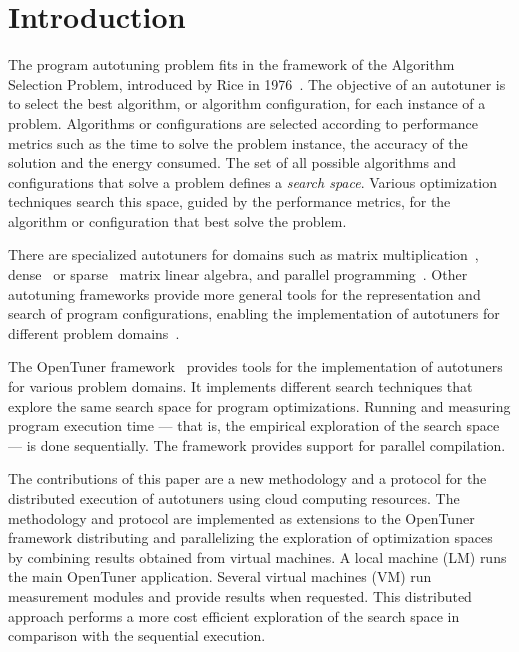 \section{Introduction} \label{sec:intro}

The program autotuning problem fits in the framework of the Algorithm Selection
Problem, introduced by Rice in 1976~\cite{rice1976algorithm}. The objective of
an autotuner is to select the best algorithm, or algorithm configuration, for
each instance of a problem.  Algorithms or configurations are selected
according to performance metrics such as the time to solve the problem
instance, the accuracy of the solution and the energy consumed.  The set of all
possible algorithms and configurations that solve a problem defines a
\emph{search space}. Various optimization techniques search this space, guided
by the performance metrics, for the algorithm or configuration that best solve
the problem.

There are specialized autotuners for domains such as matrix
multiplication~\cite{bilmes1997phipac}, dense~\cite{whaley1998atlas} or
sparse~\cite{vuduc2005oski} matrix linear algebra, and parallel
programming~\cite{jordan2012multi}. Other autotuning frameworks provide more
general tools for the representation and search of program configurations,
enabling the implementation of autotuners for different problem
domains~\cite{ansel2014opentuner,hutter2009paramils}.

The OpenTuner framework~\cite{ansel2014opentuner} provides tools for the
implementation of autotuners for various problem domains. It implements
different search techniques that explore the same search space for program
optimizations.
Running and measuring program execution time --- that is, the empirical
exploration of the search space --- is done sequentially.
The framework provides support for parallel compilation.

The contributions of this paper are a new methodology and a protocol for the
distributed execution of autotuners using cloud computing resources.  The
methodology and protocol are implemented as extensions to the OpenTuner
framework distributing and parallelizing the exploration of optimization spaces
by combining results obtained from virtual machines.  A local machine (LM) runs
the main OpenTuner application. Several virtual machines (VM) run measurement
modules and provide results when requested. This distributed approach performs
a more cost efficient exploration of the search space in comparison with the
sequential execution.

